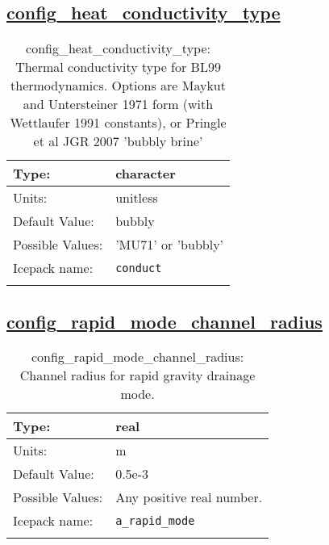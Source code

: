 \subsection[config\_heat\_conductivity\_type]{\hyperref[sec:nm_tab_thermodynamics]{config\_heat\_conductivity\_type}}
\label{subsec:nm_sec_config_heat_conductivity_type}
\begin{center}
\begin{longtable}{| p{2.0in} || p{4.0in} |}
    \hline
    Type: & character \\
    \hline
    Units: & \si{unitless} \\
    \hline
    Default Value: & bubbly \\
    \hline
    Possible Values: & 'MU71' or 'bubbly' \\
    \hline
    Icepack name: & \verb+conduct+ \\
    \hline
    \caption{config\_heat\_conductivity\_type: Thermal conductivity type for BL99 thermodynamics. Options are Maykut and Untersteiner 1971 form (with Wettlaufer 1991 constants), or Pringle et al JGR 2007 'bubbly brine'}
\end{longtable}
\end{center}
\subsection[config\_rapid\_mode\_channel\_radius]{\hyperref[sec:nm_tab_thermodynamics]{config\_rapid\_mode\_channel\_radius}}
\label{subsec:nm_sec_config_rapid_mode_channel_radius}
\begin{center}
\begin{longtable}{| p{2.0in} || p{4.0in} |}
    \hline
    Type: & real \\
    \hline
    Units: & \si{m} \\
    \hline
    Default Value: & 0.5e-3 \\
    \hline
    Possible Values: & Any positive real number. \\
    \hline
    Icepack name: & \verb+a_rapid_mode+ \\
    \hline
    \caption{config\_rapid\_mode\_channel\_radius: Channel radius for rapid gravity drainage mode.}
\end{longtable}
\end{center}

